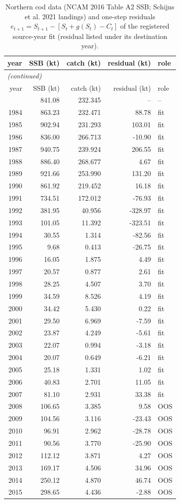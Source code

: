 \documentclass[11pt,a4paper]{article}
\begin{document}
\begin{longtable}{rrrrl}
\caption{Northern cod data (NCAM 2016 Table A2 SSB; Schijns et al. 2021 landings) and one-step residuals $e_{t+1}=S_{t+1}-[S_t+g(S_t)-C_t]$ of the registered source-year fit (residual listed under its destination year).}\label{tab:si-cod-data}\\
\toprule
year & SSB (kt) & catch (kt) & residual (kt) & role \\
\midrule
\endfirsthead
\multicolumn{5}{l}{\emph{(continued)}}\\
\toprule
year & SSB (kt) & catch (kt) & residual (kt) & role \\
\midrule
\endhead
\bottomrule
\endfoot
1983 & 841.08 & 232.345 & -- & -- \\
1984 & 863.23 & 232.471 & 88.78 & fit \\
1985 & 902.94 & 231.293 & 103.01 & fit \\
1986 & 836.00 & 266.713 & -10.90 & fit \\
1987 & 940.75 & 239.924 & 206.55 & fit \\
1988 & 886.40 & 268.677 & 4.67 & fit \\
1989 & 921.66 & 253.990 & 131.20 & fit \\
1990 & 861.92 & 219.452 & 16.18 & fit \\
1991 & 734.51 & 172.012 & -76.93 & fit \\
1992 & 381.95 & 40.956 & -328.97 & fit \\
1993 & 101.05 & 11.392 & -323.51 & fit \\
1994 & 30.55 & 1.314 & -82.56 & fit \\
1995 & 9.68 & 0.413 & -26.75 & fit \\
1996 & 16.05 & 1.875 & 4.49 & fit \\
1997 & 20.57 & 0.877 & 2.61 & fit \\
1998 & 28.25 & 4.507 & 3.70 & fit \\
1999 & 34.59 & 8.526 & 4.19 & fit \\
2000 & 34.42 & 5.430 & 0.22 & fit \\
2001 & 29.50 & 6.969 & -7.59 & fit \\
2002 & 23.87 & 4.249 & -5.61 & fit \\
2003 & 22.07 & 0.994 & -3.18 & fit \\
2004 & 20.07 & 0.649 & -6.21 & fit \\
2005 & 25.18 & 1.331 & 1.02 & fit \\
2006 & 40.83 & 2.701 & 11.05 & fit \\
2007 & 81.10 & 2.931 & 33.38 & fit \\
2008 & 106.65 & 3.385 & 9.58 & OOS \\
2009 & 104.56 & 3.116 & -23.43 & OOS \\
2010 & 96.91 & 2.962 & -28.78 & OOS \\
2011 & 90.56 & 3.770 & -25.90 & OOS \\
2012 & 112.12 & 3.871 & 4.27 & OOS \\
2013 & 169.17 & 4.506 & 34.96 & OOS \\
2014 & 250.12 & 4.870 & 46.74 & OOS \\
2015 & 298.65 & 4.436 & -2.88 & OOS \\
\end{longtable}
\end{document}
